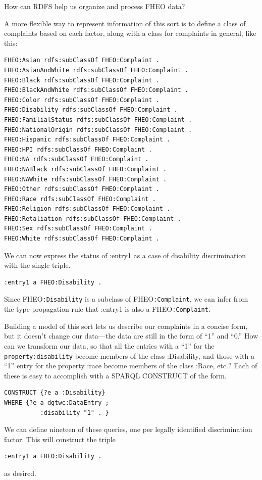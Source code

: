 \begin{challenge}{How can RDFS help us organize and process FHEO data?}

\solution

A more flexible way to represent information of this sort is to define a
class of complaints based on each factor, along with a class for
complaints in general, like this:

\begin{lstlisting}
FHEO:Asian rdfs:subClassOf FHEO:Complaint .
FHEO:AsianAndWhite rdfs:subClassOf FHEO:Complaint .
FHEO:Black rdfs:subClassOf FHEO:Complaint .
FHEO:BlackAndWhite rdfs:subClassOf FHEO:Complaint .
FHEO:Color rdfs:subClassOf FHEO:Complaint .
FHEO:Disability rdfs:subClassOf FHEO:Complaint .
FHEO:FamilialStatus rdfs:subClassOf FHEO:Complaint .
FHEO:NationalOrigin rdfs:subClassOf FHEO:Complaint .
FHEO:Hispanic rdfs:subClassOf FHEO:Complaint .
FHEO:HPI rdfs:subClassOf FHEO:Complaint .
FHEO:NA rdfs:subClassOf FHEO:Complaint .
FHEO:NABlack rdfs:subClassOf FHEO:Complaint .
FHEO:NAWhite rdfs:subClassOf FHEO:Complaint .
FHEO:Other rdfs:subClassOf FHEO:Complaint .
FHEO:Race rdfs:subClassOf FHEO:Complaint .
FHEO:Religion rdfs:subClassOf FHEO:Complaint .
FHEO:Retaliation rdfs:subClassOf FHEO:Complaint .
FHEO:Sex rdfs:subClassOf FHEO:Complaint .
FHEO:White rdfs:subClassOf FHEO:Complaint .
\end{lstlisting}

We can now express the status of :entry1 as a case of disability
discrimination with the single triple.

\begin{lstlisting}
:entry1 a FHEO:Disability .
\end{lstlisting}

Since FHEO\texttt{:Disability} is a subclass of FHEO\texttt{:Complaint}, we can infer from
the type propagation rule that :entry1 is also a FHEO\texttt{:Complaint}.

Building a model of this sort lets us describe our complaints in a
concise form, but it doesn't change our data---the data are still in the
form of ``1'' and ``0.'' How can we transform our data, so that all the
entries with a ``1'' for the \texttt{property:disability} become members of the
class :Disability, and those with a ``1'' entry for the property :race
become members of the class :Race, etc.? Each of these is easy to
accomplish with a SPARQL CONSTRUCT of the form.

\begin{lstlisting}
CONSTRUCT {?e a :Disability}
WHERE {?e a dgtwc:DataEntry ;
          :disability "1" . }
\end{lstlisting}

We can define nineteen of these queries, one per legally identified
discrimination factor. This will construct the triple

\begin{lstlisting}
:entry1 a FHEO:Disability .
\end{lstlisting}

as desired.
\end{challenge}

